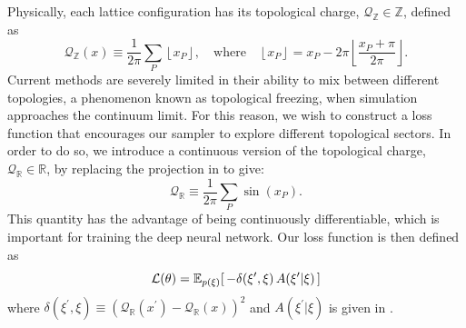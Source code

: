 \documentclass{article} %
\begin{document}
Physically, each lattice configuration has its topological charge, \(\mathcal{Q}_{\mathbb{Z}}\in\mathbb{Z}\), defined as
%
\begin{equation}
      \mathcal{Q}_{\mathbb{Z}}(x) \equiv \frac{1}{2\pi}\sum_{P}\left\lfloor x_{P}\right\rfloor,
   \quad\text{where}\quad \left\lfloor x_{P}\right\rfloor = x_{P} -
   2\pi\left\lfloor\frac{x_{P}+\pi}{2\pi}\right\rfloor.
   \label{eq:intcharge}
\end{equation}
%
Current methods are severely limited in their ability to mix between different topologies, a phenomenon known as topological freezing,
when simulation approaches the continuum limit.
%
For this reason, we wish to construct a loss function that encourages our sampler to explore different topological sectors.
%
In order to do so, we introduce a continuous version of the topological charge,
\(\mathcal{Q}_{\mathbb{R}}\in\mathbb{R}\), by replacing the projection in  to give:
%
\begin{equation}
    \mathcal{Q}_{\mathbb{R}} \equiv \frac{1}{2\pi}\sum_{P}\sin(x_{P}).
    \label{eq:sincharge}
\end{equation}
This quantity has the advantage of being continuously differentiable, which is important for training the deep neural network.
%
Our loss function is then defined as
%
\begin{equation}
   \mathcal{L}(\theta) = \mathbb{E}_{p(\xi)}{%
      \left[\,-\delta(\xi^{\prime}, \xi) \, A(\xi^{\prime}|\xi)\,\right]
   }
\end{equation}
%
where \(\delta(\xi^{\prime}, \xi) \equiv {\left(\mathcal{Q}_{\mathbb{R}}(x^{\prime}) - \mathcal{Q}_{\mathbb{R}}(x)\right)}^{2}\) and \(A(\xi^{\prime}|\xi)\) is given in .
%
%
\end{document}
